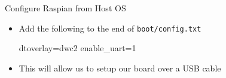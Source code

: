 \begin{frame}
   {Configure Raspian from Host OS}
   \begin{itemize}
      \item Add the following to the end of \verb?boot/config.txt?
         \begin{raw}
dtoverlay=dwc2
enable_uart=1
         \end{raw}
      \item This will allow us to setup our board over a USB cable
   \end{itemize}
\end{frame}

\cprotect{}

